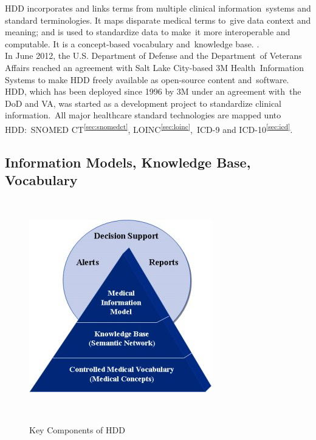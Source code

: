 \documentclass[DIV=calc, paper=a4, fontsize=12pt, onecolumn]{scrartcl}	 %
\begin{document}
  HDD incorporates and links terms from multiple clinical information\
  systems and standard terminologies. It maps disparate medical terms to\
  give data context and meaning; and is used to standardize data to make\
  it more interoperable and computable. It is a concept-based vocabulary and\
  knowledge base. \citep{_3M_Healthcare_Data_Dictionary_2013}.\\

  \noindent In June 2012, the U.S. Department of Defense and the Department\
  of Veterans Affairs reached an agreement with Salt Lake City-based 3M Health\
  Information Systems to make HDD freely available as open-source content and\
  software. HDD, which has been deployed since 1996 by 3M under an agreement with\
  the DoD and VA, was started as a development project to standardize clinical information.\
  All major healthcare standard technologies are mapped unto HDD:\
  SNOMED CT\textsuperscript{\ref{sec:snomedct}}, LOINC\textsuperscript{\ref{sec:loinc}},\
  ICD-9 and ICD-10\textsuperscript{\ref{sec:icd}}.\citep{_DeGaspari_2013}\
 
  \subsection{Information Models, Knowledge Base, Vocabulary}\

  \begin{figure}[ht!]
    \label{fig:ikv}
    \centering
    \includegraphics[scale=0.75]{hdd.jpg}
    \caption{Key Components of HDD}\citep{_3M_HDD_Product_Overview_2010}\
  \end{figure}  
\end{document}
